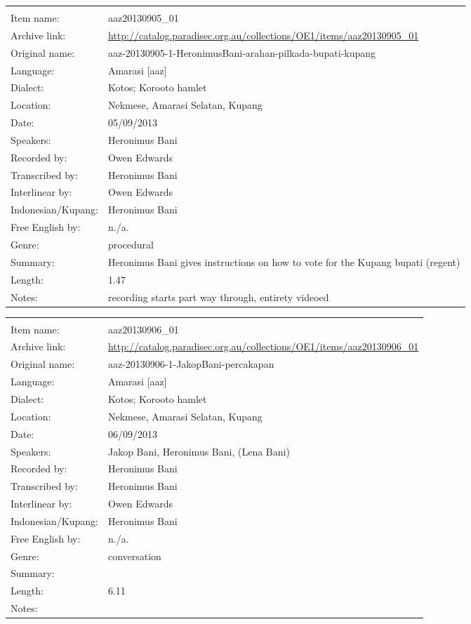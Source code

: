 \newpage
\noindent
\wg\begin{tabular}{lL{.67\textwidth}}
			& \\
Item name:			& aaz20130905{\_}01\\
Archive link:			& \url{http://catalog.paradisec.org.au/collections/OE1/items/aaz20130905_01}\\
Original name:			& {\footnotesize aaz-20130905-1-HeronimusBani-arahan-pilkada-bupati-kupang}\\
Language:				& Amarasi [aaz] \\
Dialect:				& Kotos; Koro{\Q}oto hamlet \\
Location:				& Nekmese{\Q}, Amarasi Selatan, Kupang \\
Date:				& 05/09/2013\\
Speakers:				& Heronimus Bani\\
Recorded by:			& Owen Edwards\\
Transcribed by:		& Heronimus Bani\\
Interlinear by:		& Owen Edwards \\
Indonesian/Kupang:		& Heronimus Bani\\
Free English by:		& n./a.\\
Genre:				& procedural\\
Summary:				& Heronimus Bani gives instructions on how to vote for the Kupang bupati (regent)\\
Length:				& 1.47\\
Notes:				& recording starts part way through, entirety videoed \\
\end{tabular}

\newpage
\noindent
\wg\begin{tabular}{lL{.67\textwidth}}
			& \\
Item name:			& aaz20130906{\_}01\\
Archive link:			& \url{http://catalog.paradisec.org.au/collections/OE1/items/aaz20130906_01}\\
Original name:			& aaz-20130906-1-JakopBani-percakapan\\
Language:				& Amarasi [aaz] \\
Dialect:				& Kotos; Koro{\Q}oto hamlet \\
Location:				& Nekmese{\Q}, Amarasi Selatan, Kupang \\
Date:				& 06/09/2013\\
Speakers:				& Jakop Bani, Heronimus Bani, (Lena Bani)\\
Recorded by:			& Heronimus Bani\\
Transcribed by:		& Heronimus Bani\\
Interlinear by:		& Owen Edwards \\
Indonesian/Kupang:		& Heronimus Bani\\
Free English by:		& n./a.\\
Genre:				& conversation\\
Summary:				& \\
Length:				& 6.11\\
Notes:				& \\
\end{tabular}

